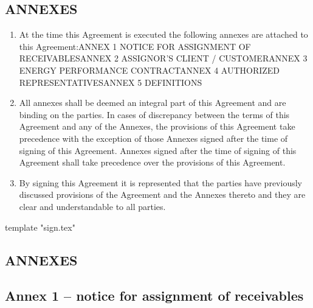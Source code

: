 \documentclass[a4paper]{article}
\begin{document}
\begin{multicols}{2}
  \subsection{ANNEXES}

  \begin{enumerate}
  \item{At the time this Agreement is executed the following
      annexes are attached to this Agreement:ANNEX 1 NOTICE FOR
      ASSIGNMENT OF RECEIVABLESANNEX 2 ASSIGNOR'S CLIENT /
      CUSTOMERANNEX 3 ENERGY PERFORMANCE CONTRACTANNEX 4 AUTHORIZED
      REPRESENTATIVESANNEX 5 DEFINITIONS}

  \item{All annexes shall be deemed an integral part of this Agreement
      and are binding on the parties. In cases of discrepancy between
      the terms of this Agreement and any of the Annexes, the
      provisions of this Agreement take precedence with the exception
      of those Annexes signed after the time of signing of this
      Agreement. Annexes signed after the time of signing of this
      Agreement shall take precedence over the provisions of this
      Agreement.}

  \item{By signing this Agreement it is represented that the parties
      have previously discussed provisions of the Agreement and the
      Annexes thereto and they are clear and understandable to all
      parties.}
  \end{enumerate}

\end{multicols}

\vspace{5mm}

{{template "sign.tex"}}

\begin{center}
  \section{ANNEXES}
\end{center}

\vspace{1cm}

\subsection{Annex 1 – notice for assignment of receivables}

\vspace{2mm}
\end{document}
